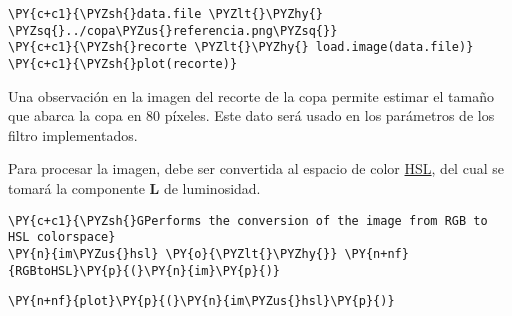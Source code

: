     \begin{tcolorbox}[breakable, size=fbox, boxrule=1pt, pad at break*=1mm,colback=cellbackground, colframe=cellborder]
\begin{Verbatim}[commandchars=\\\{\}]
\PY{c+c1}{\PYZsh{}data.file \PYZlt{}\PYZhy{} \PYZsq{}../copa\PYZus{}referencia.png\PYZsq{}}
\PY{c+c1}{\PYZsh{}recorte \PYZlt{}\PYZhy{} load.image(data.file)}
\PY{c+c1}{\PYZsh{}plot(recorte)}
\end{Verbatim}
\end{tcolorbox}

    Una observación en la imagen del recorte de la copa permite estimar el
tamaño que abarca la copa en 80 píxeles. Este dato será usado en los
parámetros de los filtro implementados.

    Para procesar la imagen, debe ser convertida al espacio de color
\href{https://es.wikipedia.org/wiki/Modelo_de_color_HSL}{HSL}, del cual
se tomará la componente \textbf{L} de luminosidad.

    \begin{tcolorbox}[breakable, size=fbox, boxrule=1pt, pad at break*=1mm,colback=cellbackground, colframe=cellborder]
\begin{Verbatim}[commandchars=\\\{\}]
\PY{c+c1}{\PYZsh{}GPerforms the conversion of the image from RGB to HSL colorspace}
\PY{n}{im\PYZus{}hsl} \PY{o}{\PYZlt{}\PYZhy{}} \PY{n+nf}{RGBtoHSL}\PY{p}{(}\PY{n}{im}\PY{p}{)}
\end{Verbatim}
\end{tcolorbox}

    \begin{tcolorbox}[breakable, size=fbox, boxrule=1pt, pad at break*=1mm,colback=cellbackground, colframe=cellborder]
\begin{Verbatim}[commandchars=\\\{\}]
\PY{n+nf}{plot}\PY{p}{(}\PY{n}{im\PYZus{}hsl}\PY{p}{)}
\end{Verbatim}
\end{tcolorbox}

    \begin{center}
    \end{center}
    { \hspace*{\fill} \\}
    
